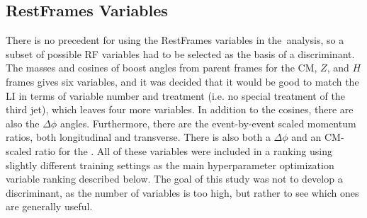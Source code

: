 \subsection{RestFrames Variables}
There is no precedent for using the RestFrames variables in the \ZH\,analysis, so a subset of possible RF variables had to be selected as the basis of a discriminant.  The masses and cosines of boost angles from parent frames for the CM, $Z$, and $H$ frames gives six variables, and it was decided that it would be good to match the LI in terms of variable number and treatment (i.e. no special treatment of the third jet), which leaves four more variables.  In addition to the cosines, there are also the $\Delta\phi$ angles.  Furthermore, there are the event-by-event scaled momentum ratios, both longitudinal and transverse.  There is also both a $\Delta\phi$ and an CM-scaled ratio for the \met.  All of these variables were included in a ranking using slightly different training settings as the main hyperparameter optimization variable ranking described below.  The goal of this study was not to develop a discriminant, as the number of variables is too high, but rather to see which ones are generally useful.  
